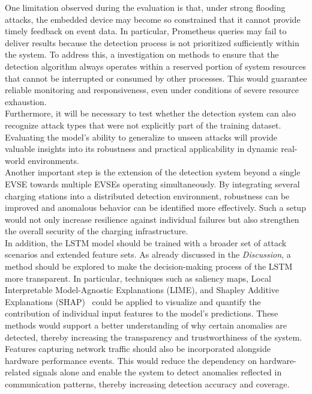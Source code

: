 One limitation observed during the evaluation is that, under strong flooding attacks, the embedded device may become so constrained that it cannot provide timely feedback on event data. In particular, Prometheus queries may fail to deliver results because the detection process is not prioritized sufficiently within the system. To address this, a investigation on methods to ensure that the detection algorithm always operates within a reserved portion of system resources that cannot be interrupted or consumed by other processes. This would guarantee reliable monitoring and responsiveness, even under conditions of severe resource exhaustion.\\

Furthermore, it will be necessary to test whether the detection system can also recognize attack types that were not explicitly part of the training dataset. Evaluating the model’s ability to generalize to unseen attacks will provide valuable insights into its robustness and practical applicability in dynamic real-world environments.\\

Another important step is the extension of the detection system beyond a single EVSE towards multiple EVSEs operating simultaneously. By integrating several charging stations into a distributed detection environment, robustness can be improved and anomalous behavior can be identified more effectively. Such a setup would not only increase resilience against individual failures but also strengthen the overall security of the charging infrastructure.\\

In addition, the LSTM model should be trained with a broader set of attack scenarios and extended feature sets. As already discussed in the \textit{Discussion}, a method should be explored to make the decision-making process of the LSTM more transparent. In particular, techniques such as saliency maps, Local Interpretable Model-Agnostic Explanations (LIME), and Shapley Additive Explanations (SHAP)~\cite{lstm_transparency} could be applied to visualize and quantify the contribution of individual input features to the model’s predictions. These methods would support a better understanding of why certain anomalies are detected, thereby increasing the transparency and trustworthiness of the system.\\

Features capturing network traffic should also be incorporated alongside hardware performance events. This would reduce the dependency on hardware-related signals alone and enable the system to detect anomalies reflected in communication patterns, thereby increasing detection accuracy and coverage.\\

